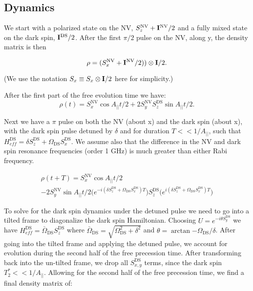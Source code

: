 \documentclass[%
 reprint,
 amsmath,amssymb,
 aps,
]{revtex4-1}
\begin{document}
\subsection{Dynamics} 

We start with a polarized state on the NV, $S_{z}^{\text{NV}} + {\bf{I}}^{\text{NV}}/2$ and a fully mixed state on the dark spin, ${\bf{I}}^{\text{DS}}/2$. After the first $\pi/2$ pulse on the NV, along y, the density matrix is then

\begin{equation}
\rho = (S_{x}^{\text{NV}}+{\bf{I}}^{\text{NV}}/2))\otimes {\bf{I}}/2.
\end{equation}

(We use the notation $S_{x} \equiv S_{x}\otimes {\bf{I}}/2$ here for simplicity.) 

After the first part of the free evolution time we have: 
\begin{equation}
\rho(t) = S_{x}^{\text{NV}} \cos{A_{||}t/2} + 2 S_{y}^{\text{NV}}S_{z}^{\text{DS}} \sin{A_{||}t/2}.
\end{equation}

Next we have a $\pi$ pulse on both the NV (about x) and the dark spin (about x), with the dark spin pulse detuned by $\delta$ and for duration $T << 1/A_{||}$, such that $H_{eff}^{\text{DS}} = \delta S_{z}^{\text{DS}} + \Omega_{\text{DS}}S_{x}^{\text{DS}}$. We assume also that the difference in the NV and dark spin resonance frequencies (order 1 GHz) is much greater than either Rabi frequency. 

\begin{align}
\rho(t + T) = S_{x}^{\text{NV}}\cos{A_{||}t/2} 
\\- 2S_{y}^{\text{NV}}\sin{A_{||}t/2}\Big(e^{-i(\delta S_{z}^{\text{DS}} + \Omega_{\text{DS}} S_{x}^{\text{DS}})T}\Big) S_{z}^{\text{DS}} \Big(e^{i(\delta S_{z}^{\text{DS}} + \Omega_{\text{DS}}S_{x}^{\text{DS}})T}\Big)
\end{align}

To solve for the dark spin dynamics under the detuned pulse we need to go into a tilted frame to diagonalize the dark spin Hamiltonian. Choosing $U = e^{-i\theta S_{y}^{\text{DS}}}$ we have $H_{eff}^{\text{DS}} = \bar\Omega_{\text{DS}} S_{z}^{\text{DS}}$ where $\bar \Omega_{\text{DS}} = \sqrt{\Omega_{\text{DS}}^2 + \delta^2}$ and $\theta = \arctan{-\Omega_{\text{DS}}/\delta}$. After going into the tilted frame and applying the detuned pulse, we account for evolution during the second half of the free precession time. After transforming back into the un-tilted frame, we drop all $S_{x,y}^{\text{DS}}$ terms, since the dark spin $T_{2}^* << 1/A_{||}$. Allowing for the second half of the free precession time, we find a final density matrix of:
\end{document}

